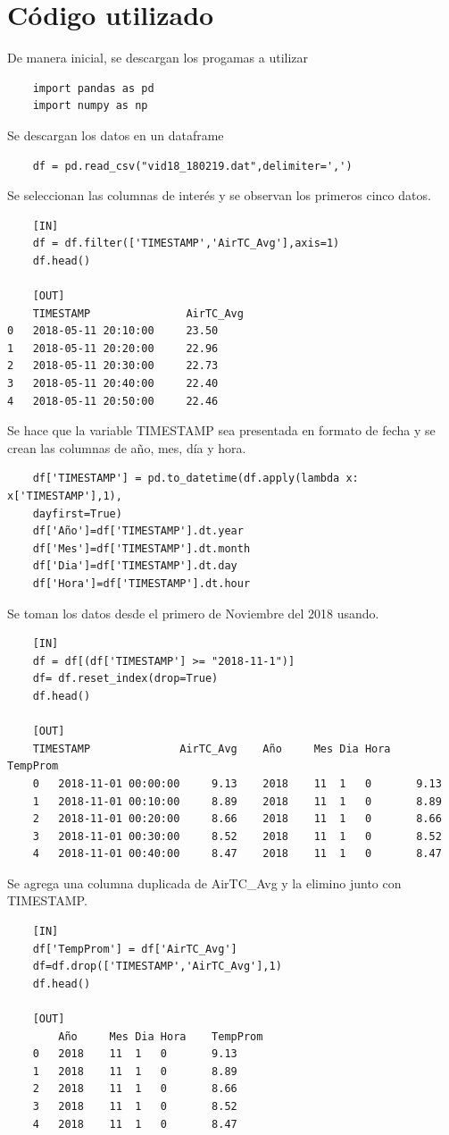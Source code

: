 \documentclass[11pt, spanish]{report}
\begin{document}
\section{Código utilizado}
De manera inicial, se descargan los progamas a utilizar
\begin{verbatim}
    import pandas as pd
    import numpy as np
\end{verbatim}
Se descargan los datos en un dataframe
\begin{verbatim}
    df = pd.read_csv("vid18_180219.dat",delimiter=',')
\end{verbatim}
Se seleccionan las columnas de interés y se observan los primeros cinco datos.
\begin{verbatim}
    [IN]
    df = df.filter(['TIMESTAMP','AirTC_Avg'],axis=1)
    df.head()
    
    [OUT]
    TIMESTAMP	            AirTC_Avg
0	2018-05-11 20:10:00	    23.50
1	2018-05-11 20:20:00	    22.96
2	2018-05-11 20:30:00	    22.73
3	2018-05-11 20:40:00	    22.40
4	2018-05-11 20:50:00	    22.46
\end{verbatim}
Se hace que la variable TIMESTAMP sea presentada en formato de fecha y se crean las columnas de año, mes, día y hora.
\begin{verbatim}
    df['TIMESTAMP'] = pd.to_datetime(df.apply(lambda x: x['TIMESTAMP'],1), 
    dayfirst=True)
    df['Año']=df['TIMESTAMP'].dt.year
    df['Mes']=df['TIMESTAMP'].dt.month
    df['Dia']=df['TIMESTAMP'].dt.day
    df['Hora']=df['TIMESTAMP'].dt.hour 
\end{verbatim}
Se toman los datos desde el primero de Noviembre del 2018 usando.
\begin{verbatim}
    [IN]
    df = df[(df['TIMESTAMP'] >= "2018-11-1")]
    df= df.reset_index(drop=True)
    df.head()
    
    [OUT]
    TIMESTAMP	           AirTC_Avg    Año 	Mes	Dia	Hora	TempProm
    0	2018-11-01 00:00:00     9.13    2018	11	1   0       9.13
    1	2018-11-01 00:10:00     8.89    2018	11	1   0       8.89
    2	2018-11-01 00:20:00     8.66    2018	11	1   0       8.66
    3	2018-11-01 00:30:00     8.52    2018	11	1   0       8.52
    4	2018-11-01 00:40:00     8.47    2018	11	1   0       8.47
\end{verbatim}
Se agrega una columna duplicada de AirTC\_Avg y la elimino junto con TIMESTAMP.
\begin{verbatim}
    [IN]
    df['TempProm'] = df['AirTC_Avg']
    df=df.drop(['TIMESTAMP','AirTC_Avg'],1)
    df.head()
    
    [OUT]
        Año     Mes	Dia	Hora	TempProm
    0   2018    11  1   0   	9.13
    1   2018    11  1   0   	8.89
    2   2018    11  1   0   	8.66
    3   2018    11  1   0   	8.52
    4   2018    11  1   0   	8.47
\end{verbatim}
\end{document}

